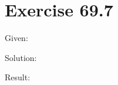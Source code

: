 \documentclass[a4paper, 10pt]{scrartcl}
\begin{document}
\section{Exercise 69.7}

Given:

Solution:

Result:
\end{document}
